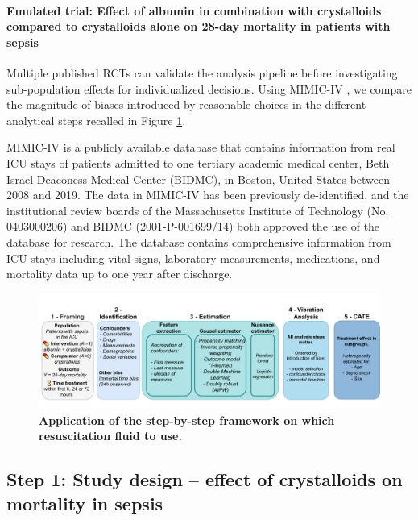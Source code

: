 \documentclass[10pt,letterpaper]{article}
\begin{document}
\paragraph{Emulated trial: Effect of albumin in combination with crystalloids
  compared to crystalloids alone on 28-day mortality in patients with sepsis}\label{emulated_trial}

Multiple published RCTs can validate the analysis pipeline before
investigating sub-population effects for individualized decisions. Using
MIMIC-IV \cite{johnson2020mimic}, we compare the magnitude of biases introduced by reasonable
choices in the different analytical steps recalled in Figure \ref{fig:study_summary}.

MIMIC-IV is a publicly available database that contains information from real
ICU stays of patients admitted to one tertiary academic medical center, Beth
Israel Deaconess Medical Center (BIDMC), in Boston, United States between 2008
and 2019. The data in MIMIC-IV has been previously de-identified, and the
institutional review boards of the Massachusetts Institute of Technology (No.
0403000206) and BIDMC (2001-P-001699/14) both approved the use of the database
for research. The database contains comprehensive information from ICU stays
including vital signs, laboratory measurements, medications, and mortality data
up to one year after discharge.

\begin{figure}[h!]
  \centering
  \includegraphics[width=\linewidth]{img_main/applied_inference_flow.pdf}
  \caption{\textbf{Application of the step-by-step framework on which resuscitation fluid to use.}}\label{fig:study_summary}
\end{figure}


\subsection*{Step 1: Study design -- effect of crystalloids on mortality in sepsis}%
\label{sec:framing_mimic_iv}
\end{document}
